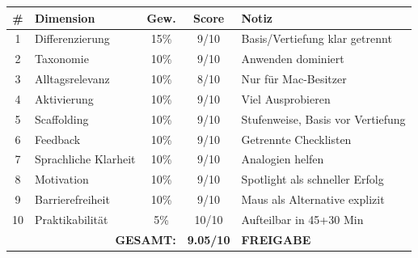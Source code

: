 \documentclass[11pt,a4paper]{article}
\begin{document}
\begin{scorebox}
\begin{tabular}{|c|l|c|c|p{3.5cm}|}
\hline
\# & Dimension & Gew. & Score & Notiz \\
\hline
1 & Differenzierung & 15\% & 9/10 & Basis/Vertiefung klar getrennt \\
2 & Taxonomie & 10\% & 9/10 & Anwenden dominiert \\
3 & Alltagsrelevanz & 10\% & 8/10 & Nur für Mac-Besitzer \\
4 & Aktivierung & 10\% & 9/10 & Viel Ausprobieren \\
5 & Scaffolding & 10\% & 9/10 & Stufenweise, Basis vor Vertiefung \\
6 & Feedback & 10\% & 9/10 & Getrennte Checklisten \\
7 & Sprachliche Klarheit & 10\% & 9/10 & Analogien helfen \\
8 & Motivation & 10\% & 9/10 & Spotlight als schneller Erfolg \\
9 & Barrierefreiheit & 10\% & 9/10 & Maus als Alternative explizit \\
10 & Praktikabilität & 5\% & 10/10 & Aufteilbar in 45+30 Min \\
\hline
\multicolumn{3}{|r|}{\textbf{GESAMT:}} & \textbf{9.05/10} & \textcolor{successgreen}{\textbf{FREIGABE}} \\
\hline
\end{tabular}
\end{scorebox}
\end{document}
